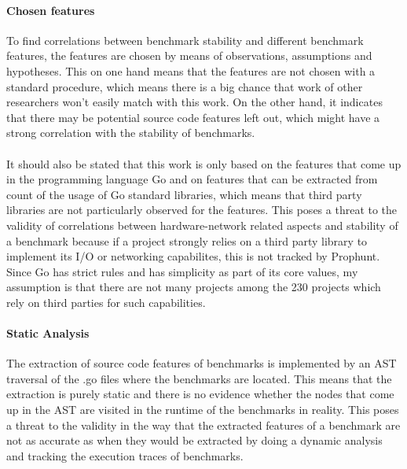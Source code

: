 \documentclass{seal_thesis}
\begin{document}
\paragraph{Chosen features}
To find correlations between benchmark stability and different benchmark features, the features are chosen by means of observations, assumptions and hypotheses. This on one hand means that the features are not chosen with a standard procedure, which means there is a big chance that work of other researchers won't easily match with this work. On the other hand, it indicates that there may be potential source code features left out, which might have a strong correlation with the stability of benchmarks.\\
\\
It should also be stated that this work is only based on the features that come up in the programming language Go and on features that can be extracted from count of the usage of Go standard libraries, which means that third party libraries are not particularly observed for the features. This poses a threat to the validity of correlations between hardware-network related aspects and stability of a benchmark because if a project strongly relies on a third party library to implement its I/O or networking capabilites, this is not tracked by Prophunt. Since Go has strict rules and has simplicity as part of its core values, my assumption is that there are not many projects among the 230 projects which rely on third parties for such capabilities.

\paragraph{Static Analysis}
The extraction of source code features of benchmarks is implemented by an AST traversal of the .go files where the benchmarks are located. This means that the extraction is purely static and there is no evidence whether the nodes that come up in the AST are visited in the runtime of the benchmarks in reality. This poses a threat to the validity in the way that the extracted features of a benchmark are not as accurate as when they would be extracted by doing a dynamic analysis and tracking the execution traces of benchmarks. 
\end{document}

